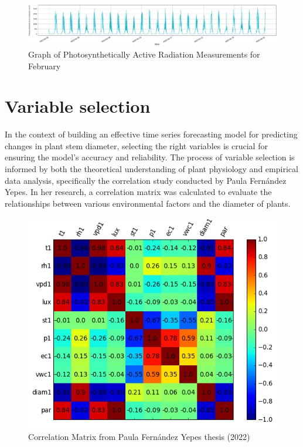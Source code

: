 \begin{figure}[htbp]
    \centering
    \includegraphics[width=15 cm]{4_ChapterMaterials/figuras/train_data_Photosynthetically_Active_Radiation.pdf}
    \caption{Graph of Photosynthetically Active Radiation Measurements for February}
    \end{figure}

\section{Variable selection}

In the context of building an effective time series forecasting model for predicting changes in plant stem diameter, selecting the right variables is crucial for ensuring the model's accuracy and reliability. The process of variable selection is informed by both the theoretical understanding of plant physiology and empirical data analysis, specifically the correlation study conducted by Paula Fernández Yepes. In her research, a correlation matrix was calculated to evaluate the relationships between various environmental factors and the diameter of plants.

\begin{figure}[htbp]
    \centering
    \includegraphics[width=10 cm]{4_ChapterMaterials/figuras/Correlation_matrix.png}
    \caption{Correlation Matrix from Paula Fernández Yepes thesis (2022)\cite{FernandezYepes2022}}
    \end{figure}

